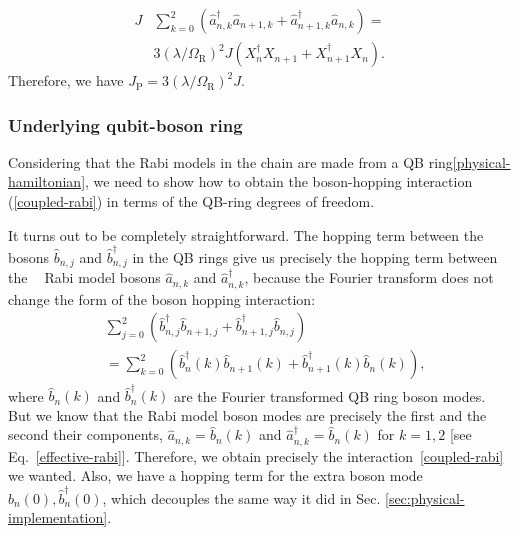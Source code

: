 \documentclass[reprint, aps, prx, amsmath, amssymb, longbibliography, superscriptaddress]{revtex4-2}
\DeclareMathOperator{\Zthree}{\mathbb{Z}_3}
\begin{document}
\begin{equation}
\begin{aligned}
    J &\sum\limits_{k=0}^{2} \left(\hat a_{n,k}^{\dagger} \hat a_{n+1,k} + \hat a_{n+1,k}^{\dagger} \hat a_{n,k}\right) = \\
    &3(\lambda/\Omega_{\textrm{R}})^2 J\left(X_n^{\dagger} X_{n+1} + X_{n+1}^{\dagger} X_n\right).
\end{aligned}
\end{equation}
Therefore, we have $J_{\text{P}} = 3(\lambda/\Omega_{\textrm{R}})^2 J$.


\subsubsection{Underlying qubit-boson ring}

Considering that the Rabi models in the chain are made from a QB ring\eqref{physical-hamiltonian}, we need to show how to obtain the boson-hopping interaction (\ref{coupled-rabi}) in terms of the QB-ring degrees of freedom.

It turns out to be completely straightforward. The hopping term between the bosons $\hat b_{n,j}$ and $\hat b_{n,j}^{\dagger}$ in the QB rings give us precisely the hopping term between the $\Zthree$ Rabi model bosons $\hat a_{n,k}$ and $\hat a_{n,k}^{\dagger}$, because the Fourier transform does not change the form of the boson hopping interaction:
\begin{equation}
\begin{aligned}
    &\sum\limits_{j=0}^2 \left(\hat b_{n,j}^{\dagger} \hat b_{n+1,j} + \hat b_{n+1,j}^{\dagger} \hat b_{n,j}\right) \\
    &=\sum\limits_{k=0}^{2} \left(\hat b_{n}^{\dagger}(k) \hat b_{n+1}(k) + \hat b_{n+1}^{\dagger}(k) \hat b_{n}(k)\right),
\end{aligned}
\end{equation}
where $\hat b_{n}(k)$ and $\hat b_n^{\dagger}(k)$ are the Fourier transformed QB ring boson modes. But we know that the Rabi model boson modes are precisely the first and the second their components, $\hat a_{n,k} = \hat b_n(k)$ and $\hat a_{n,k}^{\dagger} = \hat b_n(k)$ for $k =1,2$ [see Eq.~\eqref{effective-rabi}]. Therefore, we obtain precisely the interaction~\eqref{coupled-rabi} we wanted. Also, we have a hopping term for the extra boson mode $\hat b_{n}(0), \hat b^{\dagger}_{n}(0)$, which decouples the same way it did in Sec. \ref{sec:physical-implementation}.
\end{document}
